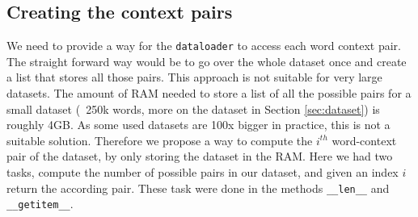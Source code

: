 \subsection{Creating the context pairs}
We need to provide a way for the \texttt{dataloader} to access each word context pair. The straight forward way would be to go  over the whole dataset once and create a list that stores all those pairs. This approach is not suitable for very large datasets. The amount of RAM  needed to store a list of all the possible pairs for a small dataset (~250k words, more on the dataset in Section \ref{sec:dataset}) is roughly 4GB.  As some used datasets are 100x bigger in practice, this is not a suitable solution. Therefore we propose a way to compute the $i^{th}$ word-context pair of the dataset, by only storing the dataset in the RAM. Here we had two tasks, compute the number of possible pairs in our dataset, and given an index $i$ return the according pair. These task were done in the methods \texttt{\_\_len\_\_} and \texttt{\_\_getitem\_\_}.

